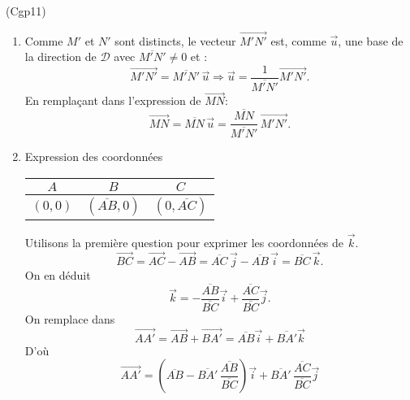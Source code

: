 \begin{tiny}(Cgp11)\end{tiny} 
\begin{enumerate}
  \item Comme $M'$ et $N'$ sont distincts, le vecteur $\overrightarrow{M'N'}$ est, comme $\overrightarrow{u}$, une base de la direction de $\mathcal{D}$ avec $\overline{M'N'} \neq 0$ et :
\begin{displaymath}
  \overrightarrow{M'N'} = \overline{M'N'}\, \overrightarrow{u}
  \Rightarrow
  \overrightarrow{u} = \frac{1}{\overline{M'N'}} \overrightarrow{M'N'}.
\end{displaymath}
En remplaçant dans l'expression de $\overrightarrow{MN}$:
\begin{displaymath}
  \overrightarrow{MN} = \overline{MN}\, \overrightarrow{u}
   = \frac{\overline{MN}}{\overline{M'N'}}\, \overrightarrow{M'N'}.
\end{displaymath}

  \item Expression des coordonnées
\begin{center}
\renewcommand{\arraystretch}{1.3}
\begin{tabular}{|c|c|c|}
\hline
$A$ & $B$ & $C$ \\ \hline
$(0,0)$ & $(\overline{AB},0)$ & $(0,\overline{AC})$ \\ \hline 
\end{tabular}   
\end{center}

Utilisons la première question pour exprimer les coordonnées de $\overrightarrow{k}$.
\begin{displaymath}
  \overrightarrow{BC} = \overrightarrow{AC} - \overrightarrow{AB}
  = \overline{AC}\, \overrightarrow{j} - \overline{AB}\, \overrightarrow{i}
  =\overline{BC}\, \overrightarrow{k}.
\end{displaymath}
On en déduit
\begin{displaymath}
  \overrightarrow{k} = - \frac{\overline{AB}}{\overline{BC}}\overrightarrow{i}
  +\frac{\overline{AC}}{\overline{BC}}\overrightarrow{j}.
\end{displaymath}
On remplace dans
\begin{displaymath}
  \overrightarrow{AA'} = \overrightarrow{AB} + \overrightarrow{BA'}
  = \overline{AB}\overrightarrow{i} + \overline{BA'}\overrightarrow{k}
\end{displaymath}
D'où
\begin{displaymath}
  \overrightarrow{AA'} = \left( \overline{AB} - \overline{BA'}\,\frac{\overline{AB}}{\overline{BC}}\right)\overrightarrow{i}
  + \overline{BA'}\,\frac{\overline{AC}}{\overline{BC}}\overrightarrow{j}
\end{displaymath}


\end{enumerate}
